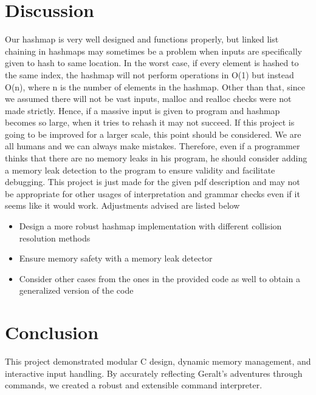 \documentclass[a4paper,12pt]{article}
\begin{document}
\section{Discussion}

Our hashmap is very well designed and functions properly, but linked list chaining in hashmaps may sometimes be a problem when inputs are specifically given to hash to same location. In the worst case, if every element is hashed to the same index, the hashmap will not perform operations in O(1) but instead O(n), where n is the number of elements in the hashmap.\newline\newline
Other than that, since we assumed there will not be vast inputs, malloc and realloc checks were not made strictly. Hence, if a massive input is given to program and hashmap becomes so large, when it tries to rehash it may not succeed. If this project is going to be improved for a larger scale, this point should be considered.\newline\newline
We are all humans and we can always make mistakes. Therefore, even if a programmer thinks that there are no memory leaks in his program, he should consider adding a memory leak detection to the program to ensure validity and facilitate debugging.\newline\newline
This project is just made for the given pdf description and may not be appropriate for other usages of interpretation and grammar checks even if it seems like it would work. Adjustments advised are listed below

\begin{itemize}
  \item Design a more robust hashmap implementation with different collision resolution methods
  \item Ensure memory safety with a memory leak detector
  \item Consider other cases from the ones in the provided code as well to obtain a generalized version of the code
\end{itemize}


\section{Conclusion}

This project demonstrated modular C design, dynamic memory management, and interactive input handling. By accurately reflecting Geralt's adventures through commands, we created a robust and extensible command interpreter.
\end{document}
